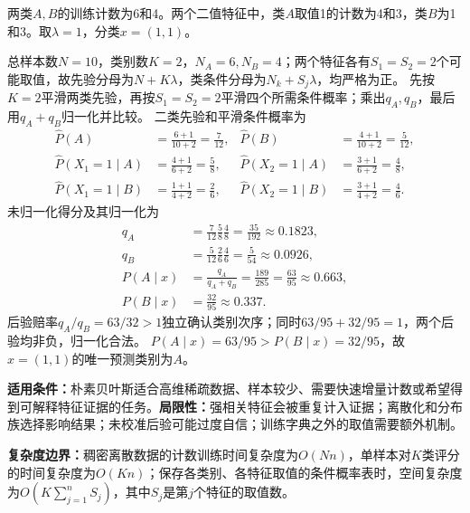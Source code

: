 \label{struct:V2-C03-CH18}
\label{struct:V2-C03-CH32}
\begin{example}[加一平滑后的朴素Bayes分类]\label{exm:V2-C03-smoothed-score}
两类$A,B$的训练计数为6和4。两个二值特征中，类$A$取值1的计数为4和3，类$B$为1和3。取$\lambda=1$，分类$x=(1,1)$。
\label{struct:V2-C03-CH33}
\end{example}
\begin{solution}
\SolGiven 总样本数$N=10$，类别数$K=2$，$N_A=6,N_B=4$；两个特征各有$S_1=S_2=2$个可能取值，故先验分母为$N+K\lambda$，类条件分母为$N_k+S_j\lambda$，均严格为正。
\SolPlan 先按$K=2$平滑两类先验，再按$S_1=S_2=2$平滑四个所需条件概率；乘出$q_A,q_B$，最后用$q_A+q_B$归一化并比较。
\SolDerive
二类先验和平滑条件概率为
\[
\begin{aligned}
\widehat P(A)&=\frac{6+1}{10+2}=\frac7{12},&
\widehat P(B)&=\frac{4+1}{10+2}=\frac5{12},\\
\widehat P(X_1=1\mid A)&=\frac{4+1}{6+2}=\frac58,&
\widehat P(X_2=1\mid A)&=\frac{3+1}{6+2}=\frac48,\\
\widehat P(X_1=1\mid B)&=\frac{1+1}{4+2}=\frac26,&
\widehat P(X_2=1\mid B)&=\frac{3+1}{4+2}=\frac46.
\end{aligned}
\]
未归一化得分及其归一化为
\[
\begin{aligned}
q_A&=\frac7{12}\frac58\frac48=\frac{35}{192}\approx0.1823,\\
q_B&=\frac5{12}\frac26\frac46=\frac5{54}\approx0.0926,\\
P(A\mid x)&=\frac{q_A}{q_A+q_B}=\frac{189}{285}=\frac{63}{95}\approx0.663,\\
P(B\mid x)&=\frac{32}{95}\approx0.337.
\end{aligned}
\]
\SolCheck 后验赔率$q_A/q_B=63/32>1$独立确认类别次序；同时$63/95+32/95=1$，两个后验均非负，归一化合法。
\SolAnswer $P(A\mid x)=63/95>P(B\mid x)=32/95$，故$x=(1,1)$的唯一预测类别为$A$。
\end{solution}

\label{struct:V2-C03-CH28}
\label{struct:V2-C03-CH29}
\begin{applicabilitybox}
\textbf{适用条件：}朴素贝叶斯适合高维稀疏数据、样本较少、需要快速增量计数或希望得到可解释特征证据的任务。\textbf{局限性：}强相关特征会被重复计入证据；离散化和分布族选择影响结果；未校准后验可能过度自信；训练字典之外的取值需要额外机制。

\textbf{复杂度边界：}稠密离散数据的计数训练时间复杂度为$O(Nn)$，单样本对$K$类评分的时间复杂度为$O(Kn)$；保存各类别、各特征取值的条件概率表时，空间复杂度为$O\!\left(K\sum_{j=1}^{n}S_j\right)$，其中$S_j$是第$j$个特征的取值数。
\end{applicabilitybox}

